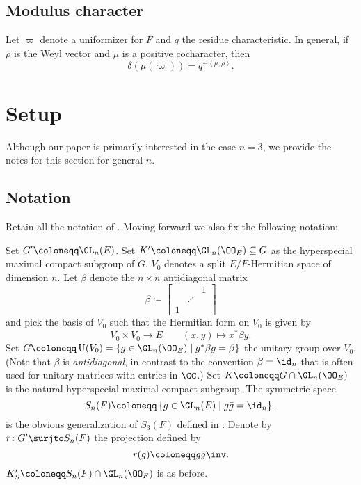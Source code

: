 \subsection{Modulus character}
Let $\varpi$ denote a uniformizer for $F$ and $q$ the residue characteristic.
In general, if $\rho$ is the Weyl vector and $\mu$ is a positive cocharacter, then
\[ \delta(\mu(\varpi)) = q^{- \left< \mu, \rho\right>}. \]

\section{Setup}
Although our paper is primarily interested in the case $n=3$,
we provide the notes for this section for general $n$.

\subsection{Notation}
Retain all the notation of .
Moving forward we also fix the following notation:
\begin{itemize}
  \ii Set $G' \coloneqq \GL_n(E)$.
  \ii Set $K' \coloneqq \GL_n(\OO_E) \subseteq G$ as the hyperspecial maximal compact subgroup of $G$.
  \ii $V_0$ denotes a split $E/F$-Hermitian space of dimension $n$.
  \ii Let $\beta$ denote the $n \times n$ antidiagonal matrix
  \[ \beta \coloneqq \begin{bmatrix} && 1 \\ & \iddots \\ 1 \end{bmatrix} \]
  and pick the basis of $V_0$ such that the Hermitian form on $V_0$ is given by
  \[ V_0 \times V_0 \to E \qquad (x,y) \mapsto x^\ast \beta y. \]
  \ii Set $G \coloneqq \U(V_0) = \{ g \in \GL_n(\OO_E) \mid g^\ast \beta g = \beta\}$
  the unitary group over $V_0$.
  (Note that $\beta$ is \emph{antidiagonal},
  in contrast to the convention $\beta = \id_n$
  that is often used for unitary matrices with entries in $\CC$.)
  \ii Set $K \coloneqq G \cap \GL_n(\OO_E)$ is the natural hyperspecial maximal compact subgroup.
  \ii The symmetric space
  \[ S_n(F) \coloneqq \left\{ g \in \GL_n(E) \mid g \bar g = \id_n \right\}. \]
  is the obvious generalization of $S_3(F)$ defined in .
  \ii Denote by $r \colon G' \surjto S_n(F)$ the projection defined by
  \[ r(g) \coloneqq g \bar{g}\inv. \]
  \ii $K'_S \coloneqq S_n(F) \cap \GL_n(\OO_F)$ is as before.
\end{itemize}

